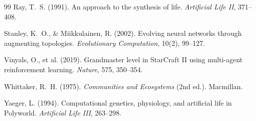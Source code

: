 \documentclass[12pt,a4paper]{article}
\begin{document}
\begin{thebibliography}{99}
Ray, T.~S. (1991).
An approach to the synthesis of life.
\textit{Artificial Life II}, 371--408.

Stanley, K.~O., \& Miikkulainen, R. (2002).
Evolving neural networks through augmenting topologies.
\textit{Evolutionary Computation}, 10(2), 99--127.

Vinyals, O., et al. (2019).
Grandmaster level in StarCraft II using multi-agent reinforcement learning.
\textit{Nature}, 575, 350--354.

Whittaker, R.~H. (1975).
\textit{Communities and Ecosystems} (2nd ed.).
Macmillan.

Yaeger, L. (1994).
Computational genetics, physiology, and artificial life in Polyworld.
\textit{Artificial Life III}, 263--298.

\end{thebibliography}
\end{document}
